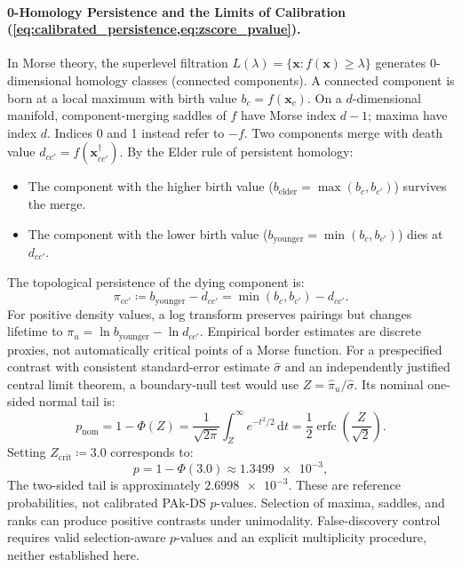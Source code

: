 \paragraph{0-Homology Persistence and the Limits of Calibration
(\cref{eq:calibrated_persistence,eq:zscore_pvalue}).}
In Morse theory, the superlevel filtration $L(\lambda) =
\{\mathbf{x} : f(\mathbf{x}) \ge \lambda\}$
generates 0-dimensional homology classes (connected components).
A connected component is born at a local maximum with birth value
$b_c = f(\mathbf{x}_c)$.
On a $d$-dimensional manifold, component-merging saddles of $f$ have
Morse index $d-1$; maxima have index $d$. Indices 0 and 1 instead
refer to $-f$. Two components merge with death value $d_{cc'}
= f(\mathbf{x}_{cc'}^\dagger)$.
By the Elder rule of persistent homology:
\begin{itemize}
  \item The component with the higher birth value
    ($b_{\mathrm{elder}} = \max(b_c, b_{c'})$) survives the merge.
  \item The component with the lower birth value
    ($b_{\mathrm{younger}} = \min(b_c, b_{c'})$) dies at $d_{cc'}$.
\end{itemize}
The topological persistence of the dying component is:
\begin{equation}
  \pi_{cc'} \coloneqq b_{\mathrm{younger}} - d_{cc'} = \min(b_c,
  b_{c'}) - d_{cc'}.
\end{equation}
For positive density values, a log transform preserves pairings but
changes lifetime to $\pi_u=\ln b_{\mathrm{younger}}-\ln d_{cc'}$.
Empirical border estimates are discrete proxies, not automatically
critical points of a Morse function. For a prespecified contrast with
consistent standard-error estimate $\hat\sigma$ and an independently
justified central limit theorem, a boundary-null test would use
$Z=\hat\pi_u/\hat\sigma$. Its nominal one-sided normal tail is:
\begin{equation}
  p_{\mathrm{nom}} = 1 - \Phi(Z) =
  \frac{1}{\sqrt{2\pi}}\int_Z^\infty e^{-t^2/2}\,\mathrm{d}t
  = \frac{1}{2}\operatorname{erfc}\left(\frac{Z}{\sqrt{2}}\right).
\end{equation}
Setting $Z_{\mathrm{crit}} \coloneqq \num{3.0}$ corresponds to:
\begin{equation}
  p = 1 - \Phi(\num{3.0}) \approx \num{1.3499e-3},
\end{equation}
The two-sided tail is approximately $\num{2.6998e-3}$.
These are reference probabilities, not calibrated PAk-DS $p$-values.
Selection of maxima, saddles, and ranks can produce positive contrasts
under unimodality. False-discovery control requires valid selection-aware
$p$-values and an explicit multiplicity procedure, neither established here.

